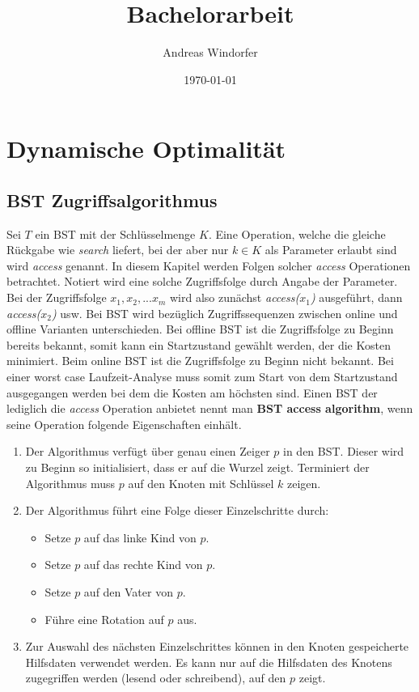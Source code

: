 \documentclass[a4paper,12pt]{article}
\title{Bachelorarbeit}
\author{
Andreas Windorfer\\
}
\date{\today}
\begin{document}
\maketitle
\newpage

\tableofcontents
\newpage

\section{Dynamische Optimalität}

\subsection{BST Zugriffsalgorithmus }
Sei $T$ ein BST mit der Schlüsselmenge $K$. Eine Operation, welche die gleiche Rückgabe wie \textit{search} liefert, bei der aber nur $k \in K $ als Parameter erlaubt sind wird \textit{access} genannt. In diesem Kapitel werden Folgen solcher \textit{access} Operationen betrachtet. Notiert wird eine solche Zugriffsfolge durch Angabe der Parameter. Bei der Zugriffsfolge $x_1,x_2,...x_m$ wird also zunächst \textit{access($x_1$)} ausgeführt, dann \textit{access($x_2$)} usw.  Bei BST wird bezüglich Zugriffssequenzen zwischen online und offline Varianten unterschieden. Bei offline BST ist die Zugriffsfolge zu Beginn bereits bekannt, somit kann ein Startzustand gewählt werden, der die Kosten minimiert. Beim online BST ist die Zugriffsfolge zu Beginn nicht bekannt. Bei einer worst case Laufzeit-Analyse muss somit zum Start von dem Startzustand ausgegangen werden bei dem die Kosten am höchsten sind.
Einen BST der lediglich die \textit{access} Operation anbietet nennt man \textbf{BST access algorithm}, wenn seine Operation folgende Eigenschaften einhält. 

\begin{enumerate} 
	\item Der Algorithmus verfügt über genau einen Zeiger $p$ in den BST. Dieser wird zu Beginn so initialisiert, dass er auf die Wurzel zeigt. Terminiert der Algorithmus muss $p$ auf den Knoten mit Schlüssel $k$ zeigen.
	\item Der Algorithmus führt eine Folge dieser Einzelschritte durch:
	\begin{itemize}
		\item Setze $p$ auf das linke Kind von $p$.
		\item Setze $p$ auf das rechte Kind von $p$.
		\item Setze $p$ auf den Vater von $p$.
		\item Führe eine Rotation auf $p$ aus.
	\end{itemize}  
	\item  Zur Auswahl des nächsten Einzelschrittes können in den Knoten gespeicherte Hilfsdaten verwendet werden. Es kann nur auf die Hilfsdaten des Knotens zugegriffen werden (lesend oder schreibend), auf den $p$ zeigt.    
\end{enumerate}
\end{document}
